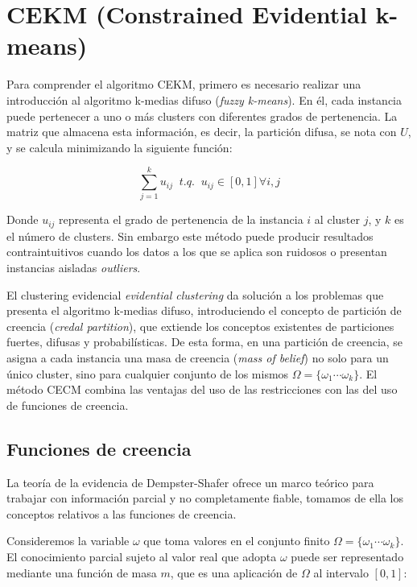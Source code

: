 \clearpage

\section{CEKM (Constrained Evidential k-means)}

Para comprender el algoritmo CEKM, primero es necesario realizar una introducción al algoritmo k-medias difuso (\textit{fuzzy k-means}). En él, cada instancia puede pertenecer a uno o más clusters con diferentes grados de pertenencia. La matriz que almacena esta información, es decir, la partición difusa, se nota con $U$, y se calcula minimizando la siguiente función:

\begin{equation}
\sum_{j=1}^{k} u_{ij} \;\; t.q. \;\; u_{ij} \in [0,1] \forall i,j
\label{eqn2}
\end{equation}

Donde $u_{ij}$ representa el grado de pertenencia de la instancia $i$ al cluster $j$, y $k$ es el número de clusters. Sin embargo este método puede producir resultados contraintuitivos cuando los datos a los que se aplica son ruidosos o presentan instancias aisladas \textit{outliers}.

El clustering evidencial \textit{evidential clustering} da solución a los problemas que presenta el algoritmo k-medias difuso, introduciendo el concepto de partición de creencia (\textit{credal partition}), que extiende los conceptos existentes de particiones fuertes, difusas y probabilísticas. De esta forma, en una partición de creencia, se asigna a cada instancia una masa de creencia (\textit{mass of belief}) no solo para un único cluster, sino para cualquier conjunto de los mismos $\Omega = \{\omega_1 \cdots \omega_k \}$. El método CECM combina las ventajas del uso de las restricciones con las del uso de funciones de creencia.

\subsection{Funciones de creencia}

La teoría de la evidencia de Dempster-Shafer ofrece un marco teórico para trabajar con información parcial y no completamente fiable, tomamos de ella los conceptos relativos a las funciones de creencia.

Consideremos la variable $\omega$ que toma valores en el conjunto finito $\Omega = \{\omega_1 \cdots \omega_k \}$. El conocimiento parcial sujeto al valor real que adopta $\omega$ puede ser representado mediante una función de masa $m$, que es una aplicación de $\Omega$ al intervalo $[0,1]$:

